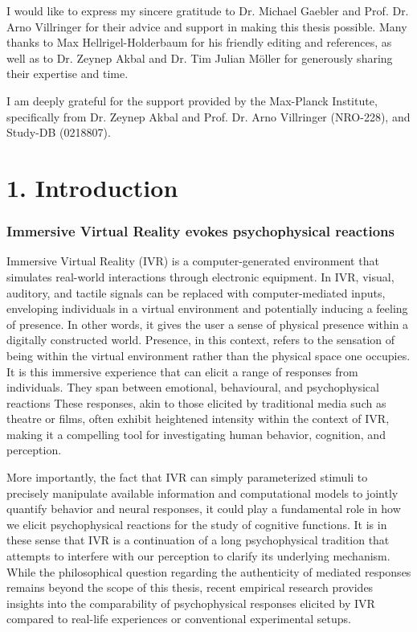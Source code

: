 \documentclass[12pt,oneside,openright]{report}
\begin{document}
\begin{adjustwidth}{1cm}{1cm}

I would like to express my sincere gratitude to Dr. Michael Gaebler and Prof. Dr. Arno Villringer for their advice and support in making this thesis possible. Many thanks to Max Hellrigel-Holderbaum for his friendly editing and references, as well as to Dr. Zeynep Akbal and Dr. Tim Julian Möller for generously sharing their expertise and time.

I am deeply grateful for the support provided by the Max-Planck Institute, specifically from Dr. Zeynep Akbal and Prof. Dr. Arno Villringer (NRO-228), and Study-DB (0218807).
    
\end{adjustwidth}

\clearpage

\section*{1. Introduction}

\subsubsection*{Immersive Virtual Reality evokes psychophysical reactions}

Immersive Virtual Reality (IVR) is a computer-generated environment that simulates real-world interactions through electronic equipment. In IVR, visual, auditory, and tactile signals can be replaced with computer-mediated inputs, enveloping individuals in a virtual environment and potentially inducing a feeling of presence. In other words, it gives the user a sense of physical presence within a digitally constructed world. Presence, in this context, refers to the sensation of being within the virtual environment rather than the physical space one occupies. It is this immersive experience that can elicit a range of responses from individuals. They span between emotional, behavioural, and psychophysical reactions \parencite{SanchezVives2005FromPT} These responses, akin to those elicited by traditional media such as theatre or films, often exhibit heightened intensity within the context of IVR, making it a compelling tool for investigating human behavior, cognition, and perception. 

More importantly, the fact that IVR can simply parameterized stimuli to precisely manipulate available information and computational models to jointly quantify behavior and neural responses, it could play a fundamental role in how we elicit psychophysical reactions for the study of cognitive functions\parencite{WASKOM2019100}. It is in these sense that IVR is a continuation of a long psychophysical tradition that attempts to interfere with our perception to clarify its underlying mechanism\parencite{deGelder2018VirtualRA}. While the philosophical question regarding the authenticity of mediated responses remains beyond the scope of this thesis, recent empirical research provides insights into the comparability of psychophysical responses elicited by IVR compared to real-life experiences or conventional experimental setups.
\end{document}
